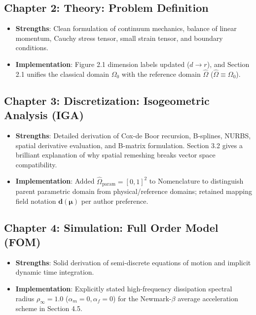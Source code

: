 \documentclass[11pt,a4paper]{article}
\begin{document}
\subsection*{Chapter 2: Theory: Problem Definition}
\begin{itemize}
    \item \textbf{Strengths}: Clean formulation of continuum mechanics, balance of linear momentum, Cauchy stress tensor, small strain tensor, and boundary conditions.
    \item \textbf{Implementation}: Figure 2.1 dimension labels updated ($d \to r$), and Section 2.1 unifies the classical domain $\Omega_0$ with the reference domain $\hat{\Omega}$ ($\hat{\Omega} \equiv \Omega_0$).
\end{itemize}

\subsection*{Chapter 3: Discretization: Isogeometric Analysis (IGA)}
\begin{itemize}
    \item \textbf{Strengths}: Detailed derivation of Cox-de Boor recursion, B-splines, NURBS, spatial derivative evaluation, and B-matrix formulation. Section 3.2 gives a brilliant explanation of why spatial remeshing breaks vector space compatibility.
    \item \textbf{Implementation}: Added $\hat{\Omega}_{\text{param}} = [0,1]^2$ to Nomenclature to distinguish parent parametric domain from physical/reference domains; retained mapping field notation $\mathbf{d}(\boldsymbol{\mu})$ per author preference.
\end{itemize}

\subsection*{Chapter 4: Simulation: Full Order Model (FOM)}
\begin{itemize}
    \item \textbf{Strengths}: Solid derivation of semi-discrete equations of motion and implicit dynamic time integration.
    \item \textbf{Implementation}: Explicitly stated high-frequency dissipation spectral radius $\rho_{\infty} = 1.0$ ($\alpha_m=0, \alpha_f=0$) for the Newmark-$\beta$ average acceleration scheme in Section 4.5.
\end{itemize}
\end{document}
